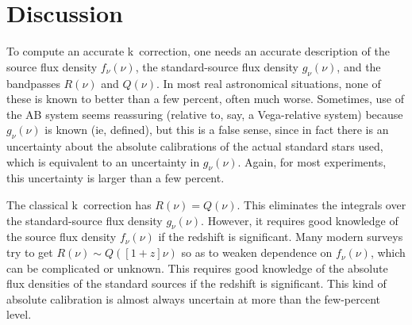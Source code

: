 \documentclass[preprint]{aastex}
\begin{document}
\section{Discussion}

To compute an accurate k~correction, one needs an accurate description
of the source flux density $f_{\nu}(\nu)$, the standard-source flux
density $g_{\nu}(\nu)$, and the bandpasses $R(\nu)$ and $Q(\nu)$.  In
most real astronomical situations, none of these is known to better
than a few percent, often much worse.  Sometimes, use of the AB system
seems reassuring (relative to, say, a Vega-relative system) because
$g_{\nu}(\nu)$ is known (ie, defined), but this is a false sense,
since in fact there is an uncertainty about the absolute calibrations
of the actual standard stars used, which is equivalent to an
uncertainty in $g_{\nu}(\nu)$.  Again, for most experiments, this
uncertainty is larger than a few percent.

The classical k~correction has $R(\nu)=Q(\nu)$.  This eliminates the
integrals over the standard-source flux density $g_{\nu}(\nu)$.
However, it requires good knowledge of the source flux density
$f_{\nu}(\nu)$ if the redshift is significant.  Many modern surveys
try to get $R(\nu)\sim Q([1+z]\nu)$ so as to weaken dependence on
$f_{\nu}(\nu)$, which can be complicated or unknown.  This requires
good knowledge of the absolute flux densities of the standard sources
if the redshift is significant.  This kind of absolute calibration is
almost always uncertain at more than the few-percent level.



\end{document}
